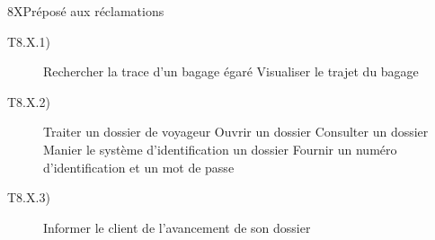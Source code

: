 \dta
{8}{X}{Préposé aux réclamations}
{
\begin{description}
	\item [T8.X.1)] Rechercher la trace d'un bagage égaré
		\subitem [T8.X.1.2] Visualiser le trajet du bagage
	\item [T8.X.2)] Traiter un dossier de voyageur
		\subitem [T8.X.2.1)] Ouvrir un dossier
		\subitem [T8.X.2.1)] Consulter un dossier
		\subitem [T8.X.2.1)] Manier le système d'identification un dossier
			\subsubitem [T8.X.2.1)] Fournir un numéro d'identification et un mot de passe
	\item [T8.X.3)] Informer le client de l'avancement de son dossier
\end{description}
}
